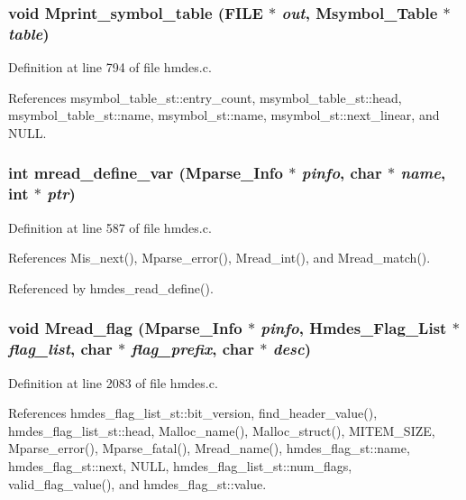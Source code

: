 \subsubsection{\setlength{\rightskip}{0pt plus 5cm}void Mprint\_\-symbol\_\-table (FILE $\ast$ {\em out}, \bf{Msymbol\_\-Table} $\ast$ {\em table})}\label{hmdes_8c_e02a2eb880e45436edfaea7651aa8288}




Definition at line 794 of file hmdes.c.

References msymbol\_\-table\_\-st::entry\_\-count, msymbol\_\-table\_\-st::head, msymbol\_\-table\_\-st::name, msymbol\_\-st::name, msymbol\_\-st::next\_\-linear, and NULL.
\subsubsection{\setlength{\rightskip}{0pt plus 5cm}int mread\_\-define\_\-var (\bf{Mparse\_\-Info} $\ast$ {\em pinfo}, char $\ast$ {\em name}, int $\ast$ {\em ptr})}\label{hmdes_8c_863ffb908bbc23df92008f34e8650173}




Definition at line 587 of file hmdes.c.

References Mis\_\-next(), Mparse\_\-error(), Mread\_\-int(), and Mread\_\-match().

Referenced by hmdes\_\-read\_\-define().
\subsubsection{\setlength{\rightskip}{0pt plus 5cm}void Mread\_\-flag (\bf{Mparse\_\-Info} $\ast$ {\em pinfo}, \bf{Hmdes\_\-Flag\_\-List} $\ast$ {\em flag\_\-list}, char $\ast$ {\em flag\_\-prefix}, char $\ast$ {\em desc})}\label{hmdes_8c_bfe7010416fe99e78e226c8f3a71815a}




Definition at line 2083 of file hmdes.c.

References hmdes\_\-flag\_\-list\_\-st::bit\_\-version, find\_\-header\_\-value(), hmdes\_\-flag\_\-list\_\-st::head, Malloc\_\-name(), Malloc\_\-struct(), MITEM\_\-SIZE, Mparse\_\-error(), Mparse\_\-fatal(), Mread\_\-name(), hmdes\_\-flag\_\-st::name, hmdes\_\-flag\_\-st::next, NULL, hmdes\_\-flag\_\-list\_\-st::num\_\-flags, valid\_\-flag\_\-value(), and hmdes\_\-flag\_\-st::value.

